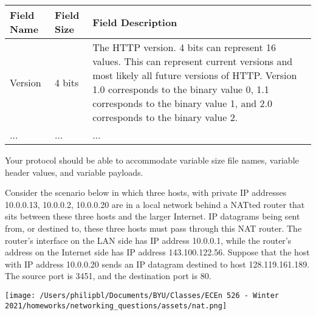 \documentclass[
  addpoints, answers]{exam}
\begin{document}
\begin{questions}
  \begin{table}[H]
  \centering
  \begin{tabular}{|l|l|p{10cm}|}
  \hline
  \textbf{Field Name} & \textbf{Field Size} & \textbf{Field Description} \\ \hline \hline
  Version             & 4 bits              & The HTTP version. 4 bits can represent 16 values. This can represent current versions and most likely all future versions of HTTP. Version 1.0 corresponds to the binary value 0, 1.1 corresponds to the binary value 1, and 2.0 corresponds to the binary value 2. \\ \hline
    ...               & ...                 & ...      \\ \hline
  \end{tabular}
  \end{table}

Your protocol should be able to accommodate variable size file names, variable header values, and variable payloads.


\begin{solution}
\end{solution}


\newpage


\question[5] Consider the scenario below in which three hosts, with private IP addresses 10.0.0.13, 10.0.0.2, 10.0.0.20 are in a local network behind a NATted router that sits between these three hosts and the larger Internet. IP datagrams being sent from, or destined to, these three hosts must pass through this NAT router. The router’s interface on the LAN side has IP address 10.0.0.1, while the router’s address on the Internet side has IP address 143.100.122.56. Suppose that the host with IP address 10.0.0.20 sends an IP datagram destined to host 128.119.161.189. The source port is 3451, and the destination port is 80.
\begin{center}
\texttt{[image: /Users/philipbl/Documents/BYU/Classes/ECEn 526 - Winter 2021/homeworks/networking\_questions/assets/nat.png]}
\end{center}

\end{questions}
\end{document}
